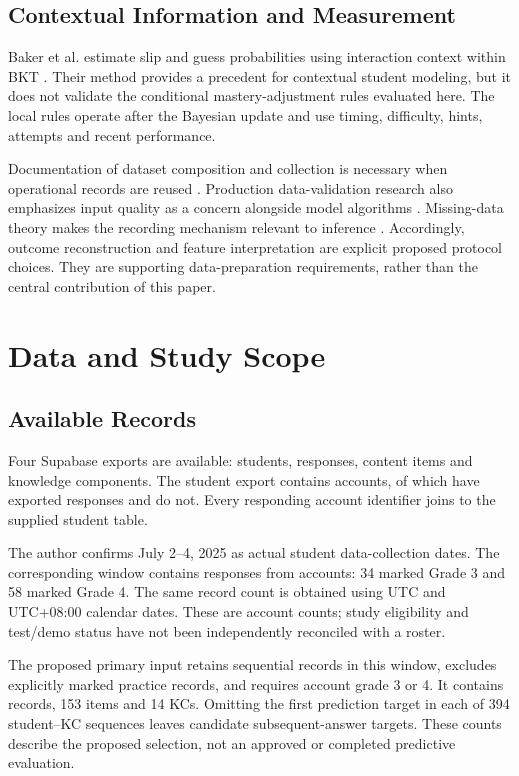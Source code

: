 \documentclass[conference]{IEEEtran}
\begin{document}
\subsection{Contextual Information and Measurement}
Baker et al. estimate slip and guess probabilities using interaction context within BKT \cite{baker2008context}. Their method provides a precedent for contextual student modeling, but it does not validate the conditional mastery-adjustment rules evaluated here. The local rules operate after the Bayesian update and use timing, difficulty, hints, attempts and recent performance.

Documentation of dataset composition and collection is necessary when operational records are reused \cite{gebru2021}. Production data-validation research also emphasizes input quality as a concern alongside model algorithms \cite{breck2019validation}. Missing-data theory makes the recording mechanism relevant to inference \cite{rubin1976}. Accordingly, outcome reconstruction and feature interpretation are explicit proposed protocol choices. They are supporting data-preparation requirements, rather than the central contribution of this paper.

\section{Data and Study Scope}
\subsection{Available Records}
Four Supabase exports are available: students, responses, content items and knowledge components. The student export contains \AccountCount{} accounts, of which \ActiveAccountCount{} have exported responses and \InactiveAccountCount{} do not. Every responding account identifier joins to the supplied student table.

The author confirms July 2--4, 2025 as actual student data-collection dates. The corresponding window contains \CollectionResponseCount{} responses from \CollectionAccountCount{} accounts: 34 marked Grade 3 and 58 marked Grade 4. The same record count is obtained using UTC and UTC+08:00 calendar dates. These are account counts; study eligibility and test/demo status have not been independently reconciled with a roster.

The proposed primary input retains sequential records in this window, excludes explicitly marked practice records, and requires account grade 3 or 4. It contains \CandidateResponseCount{} records, 153 items and 14 KCs. Omitting the first prediction target in each of 394 student--KC sequences leaves \CandidateTargetCount{} candidate subsequent-answer targets. These counts describe the proposed selection, not an approved or completed predictive evaluation.
\end{document}
